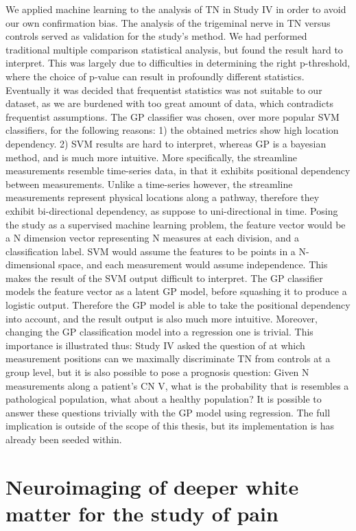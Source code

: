 We applied machine learning to the analysis of TN in Study IV in order to avoid our own confirmation bias. The analysis of the trigeminal nerve in TN versus controls served as validation for the study's method. We had performed traditional multiple comparison statistical analysis, but found the result hard to interpret. This was largely due to difficulties in determining the right p-threshold, where the choice of p-value can result in profoundly different statistics. Eventually it was decided that frequentist statistics was not suitable to our dataset, as we are burdened with too great amount of data, which contradicts frequentist assumptions. The GP classifier was chosen, over more popular SVM classifiers, for the following reasons: 1) the obtained metrics show high location dependency. 2) SVM results are hard to interpret, whereas GP is a bayesian method, and is much more intuitive. More specifically, the streamline measurements resemble time-series data, in that it exhibits positional dependency between measurements. Unlike a time-series however, the streamline measurements represent physical locations along a pathway, therefore they exhibit bi-directional dependency, as suppose to uni-directional in time. Posing the study as a supervised machine learning problem, the feature vector would be a N dimension vector representing N measures at each division, and a classification label. SVM would assume the features to be points in a N-dimensional space, and each measurement would assume independence. This makes the result of the SVM output difficult to interpret. The GP classifier models the feature vector as a latent GP model, before squashing it to produce a logistic output. Therefore the GP model is able to take the positional dependency into account, and the result output is also much more intuitive. Moreover, changing the GP classification model into a regression one is trivial. This importance is illustrated thus: Study IV asked the question of at which measurement positions can we maximally discriminate TN from controls at a group level, but it is also possible to pose a prognosis question: Given N measurements along a patient's CN V, what is the probability that is resembles a pathological population, what about a healthy population? It is possible to answer these questions trivially with the GP model using regression. The full implication is outside of the scope of this thesis, but its implementation is has already been seeded within. 

\section{Neuroimaging of deeper white matter for the study of pain}

